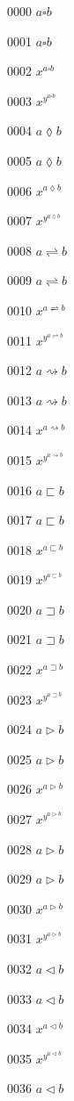 \documentclass{article}
\begin{document}
0000 $a\square b$\par
0001 $\displaystyle a\square b$\par
0002 $x^{a\square b}$\par
0003 $x^{y^{a\square b}}$\par
0004 $a\lozenge b$\par
0005 $\displaystyle a\lozenge b$\par
0006 $x^{a\lozenge b}$\par
0007 $x^{y^{a\lozenge b}}$\par
0008 $a\rightleftharpoons b$\par
0009 $\displaystyle a\rightleftharpoons b$\par
0010 $x^{a\rightleftharpoons b}$\par
0011 $x^{y^{a\rightleftharpoons b}}$\par
0012 $a\rightsquigarrow b$\par
0013 $\displaystyle a\rightsquigarrow b$\par
0014 $x^{a\rightsquigarrow b}$\par
0015 $x^{y^{a\rightsquigarrow b}}$\par
0016 $a\sqsubset b$\par
0017 $\displaystyle a\sqsubset b$\par
0018 $x^{a\sqsubset b}$\par
0019 $x^{y^{a\sqsubset b}}$\par
0020 $a\sqsupset b$\par
0021 $\displaystyle a\sqsupset b$\par
0022 $x^{a\sqsupset b}$\par
0023 $x^{y^{a\sqsupset b}}$\par
0024 $a\rhd b$\par
0025 $\displaystyle a\rhd b$\par
0026 $x^{a\rhd b}$\par
0027 $x^{y^{a\rhd b}}$\par
0028 $a\vartriangleright b$\par
0029 $\displaystyle a\vartriangleright b$\par
0030 $x^{a\vartriangleright b}$\par
0031 $x^{y^{a\vartriangleright b}}$\par
0032 $a\lhd b$\par
0033 $\displaystyle a\lhd b$\par
0034 $x^{a\lhd b}$\par
0035 $x^{y^{a\lhd b}}$\par
0036 $a\vartriangleleft b$\par
\end{document}
